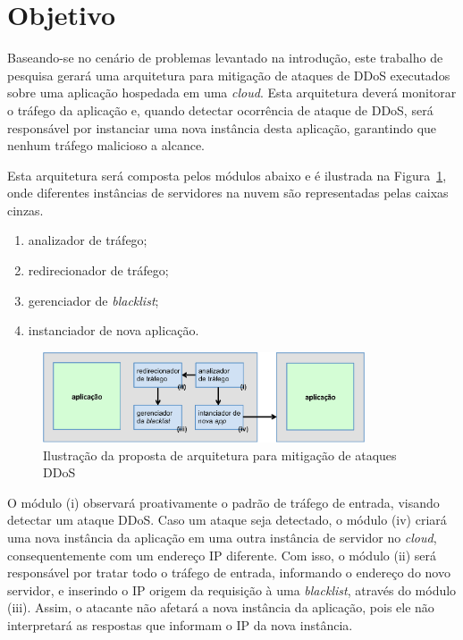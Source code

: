 \documentclass[a4paper, 11pt]{article}
\begin{document}
\section{Objetivo}
Baseando-se no cen\'ario de problemas levantado na introdu\c{c}\~{a}o, este
trabalho de pesquisa gerar\'a uma arquitetura para mitigação de ataques de
DDoS executados sobre uma aplicação hospedada em uma \emph{cloud}. Esta
arquitetura dever\'a monitorar o tr\'afego da aplica\c{c}\~{a}o e, quando
detectar
ocorrência de ataque de DDoS, ser\'a respons\'avel por instanciar uma nova
instância desta
aplica\c{c}\~{a}o, garantindo que nenhum tr\'afego malicioso a alcance.

Esta arquitetura será composta pelos módulos abaixo e é ilustrada na
Figura~\ref{fig:arq}, onde diferentes inst\^ancias de servidores na nuvem s\~ao
representadas pelas caixas cinzas.

\begin{enumerate}[i]
  \item analizador de tráfego;
  \item redirecionador de tráfego;
  \item gerenciador de \emph{blacklist};
  \item instanciador de nova aplica\c{c}\~{a}o.
\end{enumerate}

\begin{figure}[h!]
\centering
\includegraphics[width=0.85\textwidth]{arquitetura.eps}
\caption{Ilustração da proposta de arquitetura para mitigação de ataques DDoS}
\label{fig:arq}
\end{figure}

O módulo (i) observará proativamente o padrão de tráfego de entrada, visando
detectar um ataque DDoS. Caso um ataque seja detectado, o m\'odulo (iv) criará
uma nova
instância da aplicação em uma outra instância de servidor no \emph{cloud},
consequentemente com um endereço IP diferente.
Com isso, o módulo (ii) será responsável por tratar todo o tráfego de
entrada, informando o endereço do novo servidor, e inserindo o IP origem da
requisição à uma \emph{blacklist}, através do módulo (iii). Assim, o
atacante não afetará a nova instância da aplicação, pois ele não interpretará as
respostas que informam o IP da nova instância.
\end{document}
